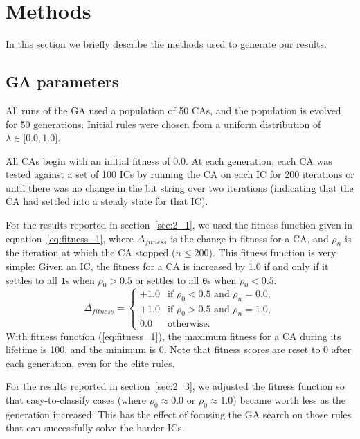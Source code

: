 
\section{Methods} \label{sec:methods}

In this section we briefly describe the methods used to generate our results.

\subsection{GA parameters}

All runs of the GA used a population of 50 CAs, and the population is evolved for 50 generations. 
Initial rules were chosen from a uniform distribution of $\lambda \in \lbrack0.0, 1.0\rbrack$.

All CAs begin with an initial fitness of 0.0. At each generation, each CA was tested against a set of 100 ICs by 
running the CA on each IC for 200 iterations or until there was no change in the bit string over two iterations (indicating that 
the CA had settled into a steady state for that IC). 

For the results reported in section~\ref{sec:2_1}, we used the fitness function given in equation~\ref{eq:fitness_1}, where 
$\Delta_{fitness}$ is the change in fitness for a CA, and $\rho_n$ is the iteration at which the CA stopped ($n \leq 200$). This fitness 
function is very simple: Given an IC, the fitness for a CA is increased by 1.0 if and only if it settles to all \texttt{1}s when $\rho_0 > 0.5$ or 
settles to all \texttt{0}s when $\rho_0 < 0.5$.
\begin{equation} \label{eq:fitness_1}
  \Delta_{fitness} =
  \begin{cases}
    +1.0 & \text{if } \rho_0 < 0.5 \text{ and } \rho_n = 0.0,
    \\
    +1.0 & \text{if } \rho_0 > 0.5 \text{ and } \rho_n = 1.0,
   \\
    0.0 & \text{otherwise}.
  \end{cases}
\end{equation}
With fitness function (\ref{eq:fitness_1}), the maximum fitness for a CA during its lifetime is 100, and the minimum is 0. Note that fitness 
scores are reset to 0 after each generation, even for the elite rules.

For the results reported in section~\ref{sec:2_3}, we adjusted the fitness function so that easy-to-classify cases (where 
$\rho_0 \approx 0.0$ or $\rho_0 \approx 1.0$) became worth less as the generation increased. This has the effect of focusing the GA 
search on those rules that can successfully solve the harder ICs.

